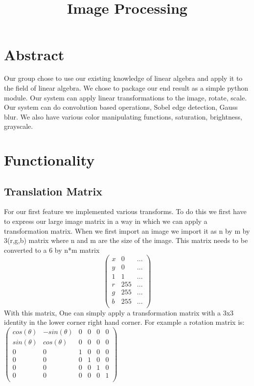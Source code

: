\documentclass[11pt]{article}
\title{\textbf{Image Processing}}
\author{}
\date{}
\begin{document}
\maketitle

\section{Abstract}
Our group chose to use our existing knowledge of linear algebra and apply it to the field of linear algebra. We chose to package our end result as a simple python module. Our system can apply linear transformations to the image, rotate, scale. Our system can do convolution based operations, Sobel edge detection, Gauss blur. We also have various color manipulating functions, saturation, brightness, grayscale.

\section{Functionality}
\subsection{Translation Matrix}
For our first feature we implemented various transforms. To do this we first have to express our large image matrix in a way in which we can apply a transformation matrix. When we first import an image we import it as n by m by 3(r,g,b) matrix where n and m are the size of the image. This matrix needs to be converted to a 6 by n*m matrix
$$\begin{pmatrix}
	x & 0 & ...\\
	y & 0 & ...\\
	1 & 1 & ...\\
	r &  255 & ...\\
	g & 255 & ...\\
	b & 255 & ...\\
\end{pmatrix}$$
 With this matrix, One can simply apply a transformation matrix with a 3x3 identity in the lower corner right hand corner. For example a rotation matrix is:
 $\begin{pmatrix} 
	cos(\theta) & -sin(\theta) & 0 & 0 & 0 & 0\\
	sin(\theta) & cos(\theta) & 0 & 0 & 0 & 0\\
	0 & 0 & 1 & 0 & 0 & 0\\
	0 & 0 & 0 & 1 & 0 & 0\\
	0 & 0 & 0 & 0 & 1 & 0\\
	0 & 0 & 0 & 0 & 0 & 1\\
\end{pmatrix}$
\end{document}
